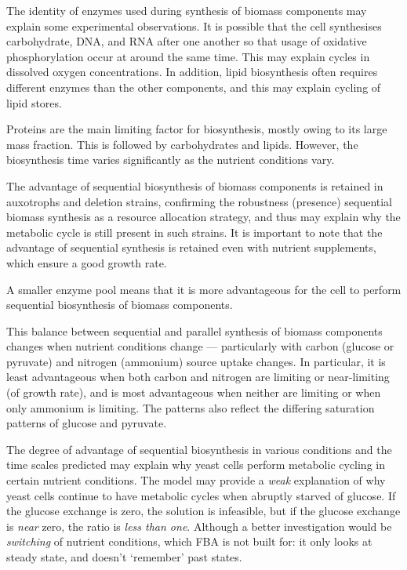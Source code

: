 The identity of enzymes used during synthesis of biomass components may explain some experimental observations.
It is possible that the cell synthesises carbohydrate, DNA, and RNA after one another so that usage of  oxidative phosphorylation occur at around the same time.
This may explain cycles in dissolved oxygen concentrations.
In addition, lipid biosynthesis often requires different enzymes than the other components, and this may explain cycling of lipid stores.

Proteins are the main limiting factor for biosynthesis, mostly owing to its large mass fraction.
This is followed by carbohydrates and lipids.
However, the biosynthesis time varies significantly as the nutrient conditions vary.

The advantage of sequential biosynthesis of biomass components is retained in auxotrophs and deletion strains, confirming the robustness (presence) sequential biomass synthesis as a resource allocation strategy, and thus may explain why the metabolic cycle is still present in such strains.
It is important to note that the advantage of sequential synthesis is retained even with nutrient supplements, which ensure a good growth rate.

A smaller enzyme pool means that it is more advantageous for the cell to perform sequential biosynthesis of biomass components.

This balance between sequential and parallel synthesis of biomass components changes when nutrient conditions change --- particularly with carbon (glucose or pyruvate) and nitrogen (ammonium) source uptake changes.
In particular, it is least advantageous when both carbon and nitrogen are limiting or near-limiting (of growth rate), and is most advantageous when neither are limiting or when only ammonium is limiting.
The patterns also reflect the differing saturation patterns of glucose and pyruvate.

The degree of advantage of sequential biosynthesis in various conditions and the time scales predicted may explain why yeast cells perform metabolic cycling in certain nutrient conditions.
The model may provide a \emph{weak} explanation of why yeast cells continue to have metabolic cycles when abruptly starved of glucose.
If the glucose exchange is zero, the solution is infeasible, but if the glucose exchange is \emph{near} zero, the ratio is \emph{less than one}.
Although a better investigation would be \emph{switching} of nutrient conditions, which FBA is not built for: it only looks at steady state, and doesn't `remember' past states.

